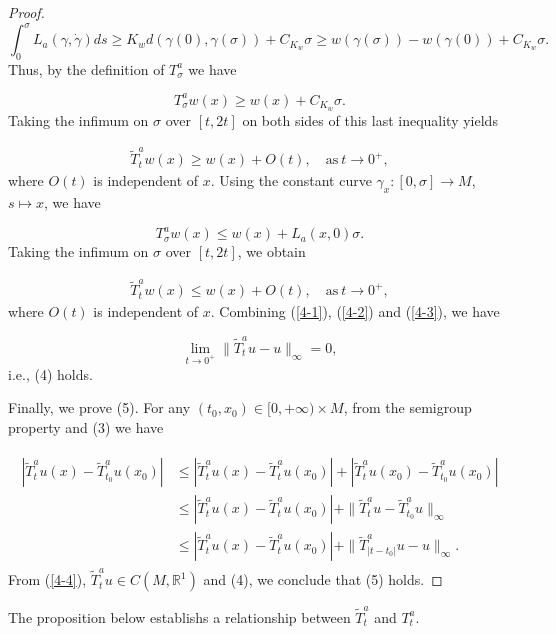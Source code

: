 \documentclass{amsart}[12pt]
\theoremstyle{definition}
\theoremstyle{remark}
\numberwithin{equation}{section}
\begin{document}
\begin{proof}
\[
\int_0^\sigma L_a(\gamma,\dot{\gamma})ds\geq
K_wd(\gamma(0),\gamma(\sigma))+C_{K_w}\sigma\geq
w(\gamma(\sigma))-w(\gamma(0))+C_{K_w}\sigma.
\]
Thus, by the definition of $T^a_\sigma$ we have

\[
T^a_\sigma w(x)\geq w(x)+C_{K_w}\sigma.
\]
Taking the infimum on $\sigma$ over $[t,2t]$ on both sides of this last
inequality yields

\begin{align}\label{4-2}
\tilde{T}^a_tw(x)\geq w(x)+O(t), \quad \mathrm{as}\ t\rightarrow
0^+,
\end{align}
where $O(t)$ is independent of $x$. Using the constant curve
$\gamma_x:[0,\sigma]\rightarrow M$, $s\mapsto x$, we have

\[
T^a_\sigma w(x)\leq w(x)+L_a(x,0)\sigma.
\]
Taking the infimum on $\sigma$ over $[t,2t]$, we obtain

\begin{align}\label{4-3}
\tilde{T}^a_tw(x)\leq w(x)+O(t), \quad \mathrm{as}\ t\rightarrow
0^+,
\end{align}
where $O(t)$ is independent of $x$. Combining (\ref{4-1}),
(\ref{4-2}) and (\ref{4-3}), we have

\[
\lim_{t\rightarrow 0^+}\|\tilde{T}^a_tu-u\|_\infty=0,
\]
i.e., (4) holds.

Finally, we prove (5). For any $(t_0,x_0)\in[0,+\infty)\times M$,
from the semigroup property and (3) we have

\begin{align}\label{4-4}
\begin{split}
|\tilde{T}^a_tu(x)-\tilde{T}^a_{t_0}u(x_0)|&
\leq|\tilde{T}^a_tu(x)-\tilde{T}^a_tu(x_0)|+|\tilde{T}^a_tu(x_0)-\tilde{T}^a_{t_0}u(x_0)|\\
&\leq
|\tilde{T}^a_tu(x)-\tilde{T}^a_tu(x_0)|+\|\tilde{T}^a_tu-\tilde{T}^a_{t_0}u\|_\infty\\
&\leq|\tilde{T}^a_tu(x)-\tilde{T}^a_tu(x_0)|+\|\tilde{T}^a_{|t-t_0|}u-u\|_\infty.
\end{split}
\end{align}
From (\ref{4-4}), $\tilde{T}^a_tu\in C(M,\mathbb{R}^1)$ and
(4), we conclude that (5) holds.
\end{proof}

The proposition below establishs a relationship between
$\tilde{T}^a_t$ and $T^a_t$.
\end{document}
